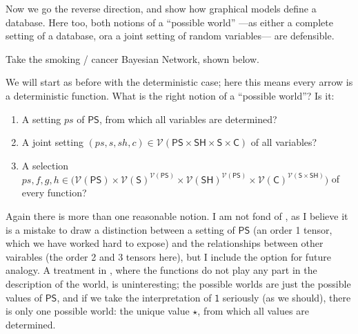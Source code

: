 \documentclass{article}
\newcommand\cmergearr[4]{
		\draw[arr,-] (#1) -- (#4) -- (#2);
		\draw[arr, shorten <=0] (#4) -- (#3);
	}
\newcommand\mergearr[3]{
		\coordinate (center-#1#2#3) at (barycentric cs:#1=1,#2=1,#3=1.2);
		\cmergearr{#1}{#2}{#3}{center-#1#2#3}
	}
\theoremstyle{definition}
\theoremstyle{remark}
\newcommand{\V}{\mathcal V}
\newcommand{\var}[1]{\mathsf{#1}}
\begin{document}
Now we go the reverse direction, and show how graphical models define a database. Here too, both notions of a ``possible world'' ---as either a complete setting of a database, ora a joint setting of random variables--- are defensible.
\begin{example}
    Take the smoking / cancer Bayesian Network, shown below.
    \begin{center}
    \end{center}
    
    We will start as before with the deterministic case; here this means every arrow is a deterministic function. What is the right notion of a ``possible world''? Is it:

    \begin{enumerate}[label=(\arabic*)]
        \item A setting $ps$ of $\var{PS}$, from which all variables are determined? \label{item:initsetting}
        \item A joint setting $(ps, s, sh, c) \in \V(\var{PS \times SH \times S \times C})$ of all variables? \label{item:jointsetting}
        \item A selection $ps,f,g,h \in \Big(\var{\V(PS) \times \V(S)^{\V(PS)}\times \V(SH)^{\V(PS)}\times \V(C)^{\V(S\times SH)}} \Big)$ of every function? \label{item:everyfunction}
    \end{enumerate}
    
    Again there is more than one reasonable notion. I am not fond of , as I believe it is a mistake to draw a distinction between a setting of $\var{PS}$ (an order 1 tensor, which we have worked hard to expose) and the relationships between other vairables (the order 2 and 3 tensors here), but I include the option for future analogy. A treatment in , where the functions do not play any part in the description of the world, is uninteresting; the possible worlds are just the possible values of $\var{PS}$, and if we take the interpretation of $\var 1$ seriously (as we should), there is only one possible world: the unique value $\star$, from which all values are determined. 
    

\end{example}
\end{document}
